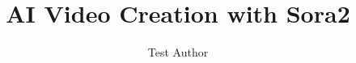 \documentclass[12pt,a4paper]{book}
\begin{document}
\frontmatter
\title{AI Video Creation with Sora2}
\author{Test Author}
\maketitle

\mainmatter

\end{document}
